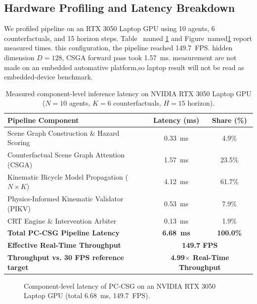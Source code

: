 \subsection{Hardware Profiling and Latency Breakdown}
We profiled pipeline on an RTX 3050 Laptop GPU using 10 agents, 6 counterfactuals, and 15 horizon steps. Table~ named \ref{table_latency} and Figure~named\ref{fig_latency} report  measured times.  this configuration, the pipeline reached 149.7~FPS.  hidden dimension $D=128$,  CSGA forward pass took 1.57~ms. measurement are not made on an embedded automative platform,so laptop result will not be read as embedded-device benchmark. 
\begin{table}[H]
\caption{Measured component-level inference latency on  NVIDIA RTX 3050 Laptop GPU ($N=10$ agents, $K=6$ counterfactuals, $H=15$ horizon).}
\centering
\label{table_latency}
\begin{tabular}{l|c|c}
\hline
\textbf{Pipeline Component} & \textbf{Latency (ms)} & \textbf{Share (\%)} \\
\hline
Scene Graph Construction \& Hazard Scoring & 0.33~ms & 4.9\% \\
Counterfactual Scene Graph Attention (CSGA) & 1.57~ms & 23.5\% \\
Kinematic Bicycle Model Propagation ($N \times K$) & 4.12~ms & 61.7\% \\
Physics-Informed Kinematic Validator (PIKV) & 0.53~ms & 7.9\% \\
CRT Engine \& Intervention Arbiter & 0.13~ms & 1.9\% \\
\hline
\textbf{Total PC-CSG Pipeline Latency} & \textbf{6.68~ms} & \textbf{100.0\%} \\
\textbf{Effective Real-Time Throughput} & \multicolumn{2}{c}{\textbf{149.7 FPS}} \\
\textbf{Throughput vs. 30 FPS reference target} & \multicolumn{2}{c}{\textbf{4.99$\times$ Real-Time Throughput}} \\
\hline
\end{tabular}
\end{table}

\begin{figure}[H]
\centering
{}
\captionsetup{singlelinecheck = false, format= hang, justification=justified, font=footnotesize, labelsep=space}
\caption{Component-level latency of PC-CSG on an NVIDIA RTX 3050 Laptop GPU (total 6.68~ms, 149.7~FPS).}
\label{fig_latency}
\end{figure}


